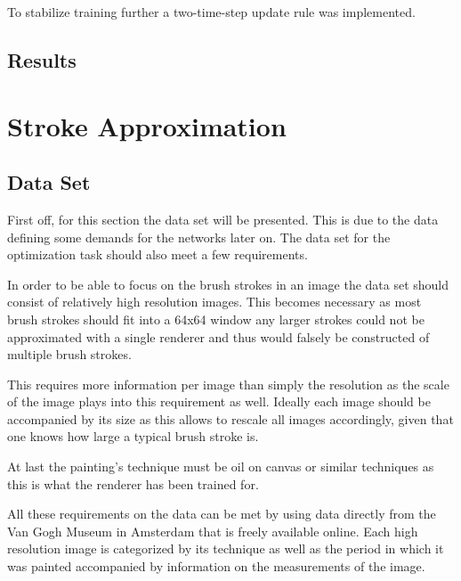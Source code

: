 To stabilize training further a two-time-step update rule was implemented.

\subsection{Results}


\section{Stroke Approximation}

\subsection{Data Set}
First off, for this section the data set will be presented.
This is due to the data defining some demands for the networks later on.
The data set for the optimization task should also meet a few requirements.

In order to be able to focus on the brush strokes in an image the data set should
consist of relatively high resolution images.
This becomes necessary as most brush strokes should fit into a 64x64 window any larger
strokes could not be approximated with a single renderer and thus would falsely be constructed
of multiple brush strokes.

This requires more information per image than simply the resolution as the scale
of the image plays into this requirement as well.
Ideally each image should be accompanied by its size as this allows to rescale all 
images accordingly, given that one knows how large a typical brush stroke is.

At last the painting's technique must be oil on canvas or similar techniques as this
is what the renderer has been trained for.

All these requirements on the data can be met by using data directly from the Van
Gogh Museum in Amsterdam that is freely available online.
Each high resolution image is categorized by its technique as well as the period
in which it was painted accompanied by information on the measurements of the image.

